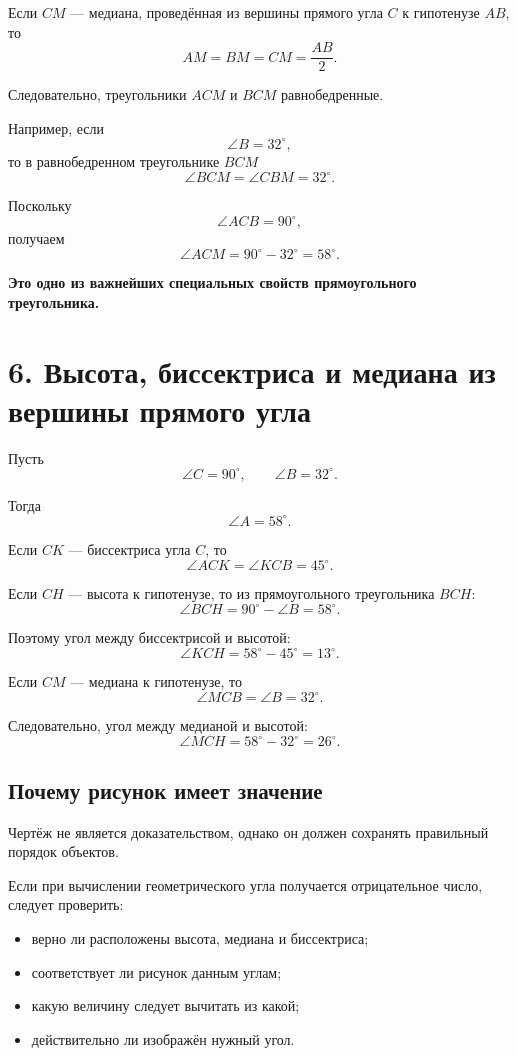 \documentclass[a4paper,12pt]{article}
\newcommand{\key}[1]{\textcolor{darkaccent}{\textbf{#1}}}
\begin{document}
Если \(CM\) --- медиана, проведённая из вершины прямого угла \(C\) к гипотенузе \(AB\), то
\[
\boxed{
AM=BM=CM=\frac{AB}{2}.
}
\]

Следовательно, треугольники \(ACM\) и \(BCM\) равнобедренные.

Например, если
\[
\angle B=32^\circ,
\]
то в равнобедренном треугольнике \(BCM\)
\[
\angle BCM=\angle CBM=32^\circ.
\]

Поскольку
\[
\angle ACB=90^\circ,
\]
получаем
\[
\angle ACM=90^\circ-32^\circ=58^\circ.
\]

\key{Это одно из важнейших специальных свойств прямоугольного треугольника.}


\newpage
\section*{\textcolor{darkaccent}{6. Высота, биссектриса и медиана из вершины прямого угла}}

Пусть
\[
\angle C=90^\circ,
\qquad
\angle B=32^\circ.
\]

Тогда
\[
\angle A=58^\circ.
\]

Если \(CK\) --- биссектриса угла \(C\), то
\[
\angle ACK=\angle KCB=45^\circ.
\]

Если \(CH\) --- высота к гипотенузе, то из прямоугольного треугольника \(BCH\):
\[
\angle BCH
=
90^\circ-\angle B
=
58^\circ.
\]

Поэтому угол между биссектрисой и высотой:
\[
\angle KCH
=
58^\circ-45^\circ
=
13^\circ.
\]

Если \(CM\) --- медиана к гипотенузе, то
\[
\angle MCB=\angle B=32^\circ.
\]

Следовательно, угол между медианой и высотой:
\[
\angle MCH
=
58^\circ-32^\circ
=
26^\circ.
\]

\subsection*{Почему рисунок имеет значение}

Чертёж не является доказательством, однако он должен сохранять правильный порядок объектов.

Если при вычислении геометрического угла получается отрицательное число, следует проверить:

\begin{itemize}
    \item верно ли расположены высота, медиана и биссектриса;
    \item соответствует ли рисунок данным углам;
    \item какую величину следует вычитать из какой;
    \item действительно ли изображён нужный угол.
\end{itemize}
\end{document}
